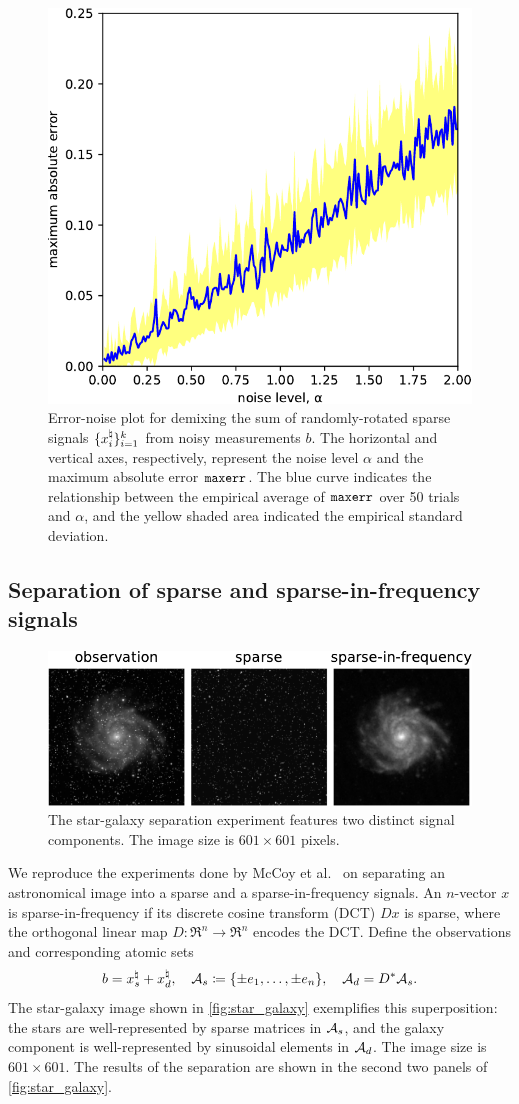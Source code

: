 \begin{figure}[t]
    \centering\small
    \includegraphics[width=.5\linewidth]{./figures/relation_e_noise.pdf}
    \caption{Error-noise plot for demixing the sum of randomly-rotated sparse signals $\{x_i^{\natural}\}_{i=1}^k$ from noisy measurements $b$. The horizontal and vertical axes, respectively, represent the noise level $\alpha$ and the maximum absolute error $\mathop{\tt maxerr}$. The blue curve indicates the relationship between the empirical average of $\mathop{\tt maxerr}$ over 50 trials and $\alpha$, and the yellow shaded area indicated the empirical standard deviation. }
    \label{fig:phase_transition3}
\end{figure}


\subsection{Separation of sparse and sparse-in-frequency signals} \label{sec:6.2}

\begin{figure}[t]
    \centering
   \includegraphics[width=.9\textwidth]{./figures/StarGalaxy.pdf}
    \caption{The star-galaxy separation experiment features two distinct signal components. The image size is $601\times601$ pixels.}
    \label{fig:star_galaxy}
\end{figure}

We reproduce the experiments done by McCoy et al.~\cite{mccoy2014convexity} on separating an astronomical image into a sparse and a sparse-in-frequency signals. An $n$-vector $x$ is sparse-in-frequency if its discrete cosine transform (DCT) $Dx$ is sparse, where the orthogonal linear map $D:\Re^n\to\Re^n$ encodes the DCT. Define the observations and corresponding atomic sets
\[
  b = x^{\natural}_s + x^{\natural}_d,
  \quad
  \mathcal{A}_s \coloneqq  \{\pm e_1, \dots, \pm e_n\}, \quad \mathcal{A}_d = D^*\mathcal{A}_s.
\]
The star-galaxy image shown in \autoref{fig:star_galaxy} exemplifies this superposition: the stars are well-represented by sparse matrices in $\mathcal{A}_s$, and the galaxy component is well-represented by sinusoidal elements in $\mathcal{A}_d$. The image size is $601\times601$. The results of the separation are shown in the second two panels of \autoref{fig:star_galaxy}.

